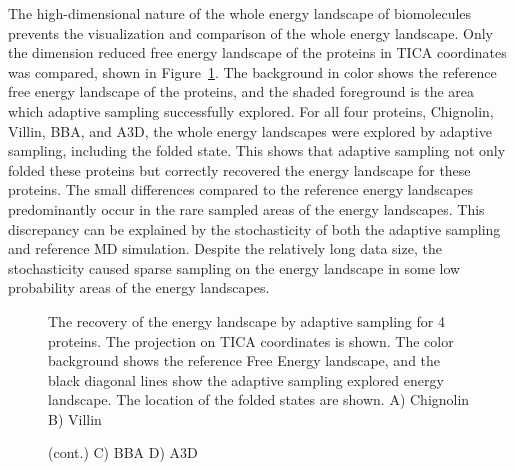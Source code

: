 The high-dimensional nature of the whole energy landscape of biomolecules prevents the visualization and comparison of the whole energy landscape. Only the dimension reduced free energy landscape of the proteins in TICA coordinates was compared, shown in Figure~\ref{fig:overlap}. The background in color shows the reference free energy landscape of the proteins, and the shaded foreground is the area which adaptive sampling successfully explored. For all four proteins, Chignolin, Villin, BBA, and A3D, the whole energy landscapes were explored by adaptive sampling, including the folded state. This shows that adaptive sampling not only folded these proteins but correctly recovered the energy landscape for these proteins. The small differences compared to the reference energy landscapes predominantly occur in the rare sampled areas of the energy landscapes. This discrepancy can be explained by the stochasticity of both the adaptive sampling and reference MD simulation. Despite the relatively long data size, the stochasticity caused sparse sampling on the energy landscape in some low probability areas of the energy landscapes.  


\begin{figure}[H]
\centering
   \begin{subfigure}[b]{0.6\linewidth}
   {}
   \end{subfigure}%
   
   \begin{subfigure}[b]{0.6\linewidth}
   {}
   \end{subfigure}%


  \caption{The recovery of the energy landscape by adaptive sampling for 4 proteins. The projection on TICA coordinates is shown. The
 color background shows the reference Free Energy landscape, and the black diagonal lines show the adaptive sampling explored energy landscape. The location of the folded states are shown.  A) Chignolin B) Villin }
\end{figure}

\begin{figure}[H]\ContinuedFloat
\centering
   \begin{subfigure}[b]{0.6\linewidth}
   {}
   \end{subfigure}%
  
   \begin{subfigure}[b]{0.6\linewidth}
   {}
   \end{subfigure}%

  \caption{(cont.) C) BBA D) A3D} 
  \label{fig:overlap}
\end{figure}

